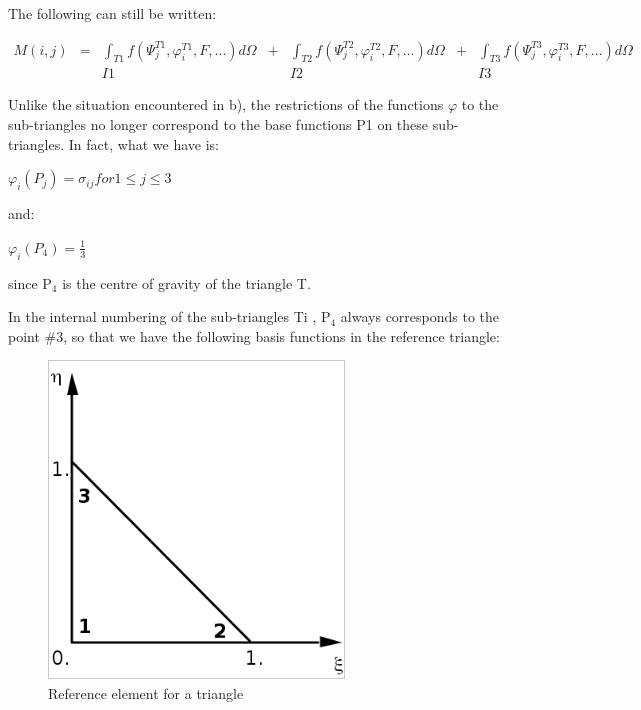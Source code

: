 The following can still be written:

\[
\begin{array}{ccccccc}
M(i,j) & = &\int _{T1}f(\Psi _{j}^{T1} ,\varphi _{i}^{T1} ,F,...)d\Omega & + & \int _{T2}f(\Psi _{j}^{T2} ,\varphi _{i}^{T2} ,F,...)d\Omega & + & \int _{T3}f(\Psi _{j}^{T3} ,\varphi _{i}^{T3} ,F,...)d\Omega  \\
       &   &   I1                                                         &   &    I2                                                        &   &   I3
\end{array}
\]

Unlike the situation encountered in b), the restrictions of the functions $\varphi$ to
the sub-triangles no longer correspond to the base functions P1 on these
sub-triangles. In fact, what we have is:

$\varphi_{i}(P_{j})=\sigma _{ij} for 1 \le j \le 3$

and:

$\varphi_{i}(P_{4})=\frac{1}{3}$

since P${}_{4}$ is the centre of gravity of the triangle T.

In the internal numbering of the sub-triangles Ti , P${}_{4}$ always
corresponds to the point \#3, so that we have the following basis
functions in the reference triangle:


\begin{figure}[H]%
\begin{center}
%
  \includegraphics[width=0.7\textwidth]{./graphics/ref-triangle}
%
\end{center}
\caption{Reference element for a triangle}
\label{fig:reftriangle}
\end{figure}


